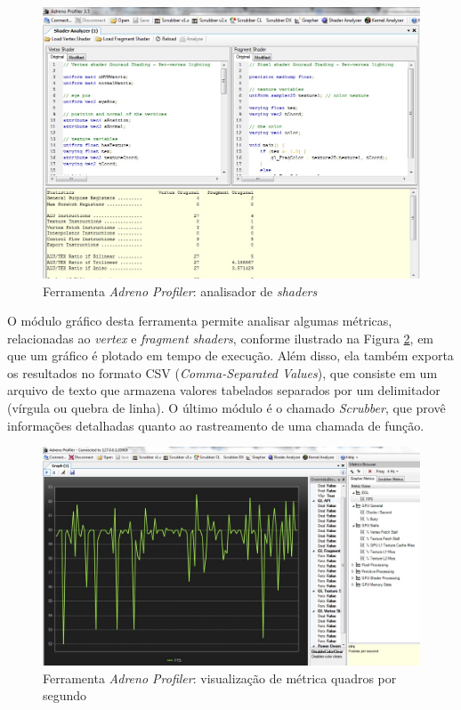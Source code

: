 	\begin{figure}[ht]
	\centering
		\includegraphics[keepaspectratio=true,scale=0.4]{figuras/shader_analyzer.jpg}
	\caption{Ferramenta \textit{Adreno Profiler}: analisador de \textit{shaders}}
	\label{adrenoProfiler}
	\end{figure}

	O módulo gráfico desta ferramenta permite analisar algumas métricas, relacionadas ao \textit{vertex} e \textit{fragment shaders}, conforme ilustrado na Figura \ref{graph}, em que um gráfico é plotado em tempo de execução. Além disso, ela também exporta os resultados no formato CSV (\textit{Comma-Separated Values}), que consiste em um arquivo de texto que armazena valores tabelados separados por um delimitador (vírgula ou quebra de linha). O último módulo é o chamado \textit{Scrubber}, que provê informações detalhadas quanto ao rastreamento de uma chamada de função. 

	\begin{figure}[ht]
	\centering
		\includegraphics[keepaspectratio=true,scale=0.35]{figuras/graph.jpg}
	\caption{Ferramenta \textit{Adreno Profiler}: visualização de métrica quadros por segundo}
	\label{graph}
	\end{figure}

